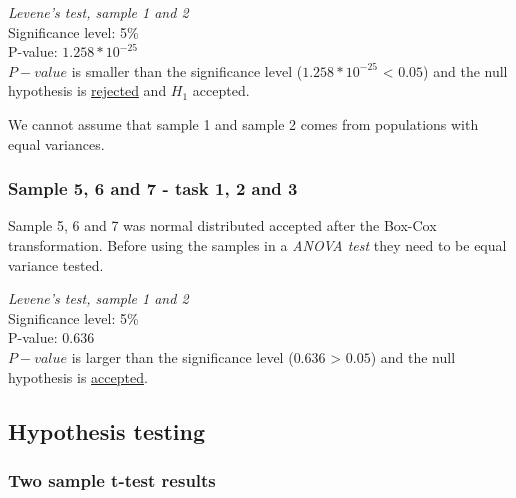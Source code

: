  \begin{center}
	\begin{tcolorbox}[box align=center,width=\textwidth-5cm]
		\centering
		\textit{Levene's test, sample 1 and 2}\\
		Significance level: 5\%  \\[0.5cm]
		
		P-value: $1.258 * 10^{-25}$\\[0.2cm]
		
		$P-value$ is smaller than the significance level ($1.258*10^{-25}$ < $0.05$) and the null hypothesis is \underline{rejected} and $H_1$ accepted.\\[0.5cm]
	\end{tcolorbox} 
\end{center}

We cannot assume that sample 1 and sample 2 comes from populations with equal variances. 

\subsubsection{Sample 5, 6 and 7 - task 1, 2 and 3}\label{sec:sample5,6,7}
Sample 5, 6 and 7 was normal distributed accepted after the Box-Cox transformation. Before using the samples in a \textit{ANOVA test} they need to be equal variance tested. 

 \begin{center}
	\begin{tcolorbox}[box align=center,width=\textwidth-5cm]
		\centering
		\textit{Levene's test, sample 1 and 2}\\
		Significance level: 5\%  \\[0.5cm]
		
		P-value: $0.636$\\[0.2cm]
		
		$P-value$ is larger than the significance level ($0.636$ > $0.05$) and the null hypothesis is \underline{accepted}.\\[0.5cm]
	\end{tcolorbox} 
\end{center}


\subsection{Hypothesis testing}\label{sec:hypothesis_results}

\subsubsection{Two sample t-test results}\label{sec:t-test_result}

